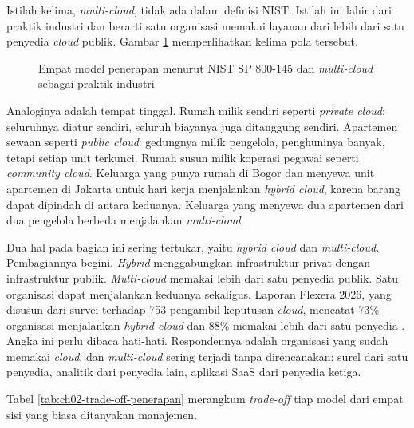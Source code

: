 Istilah kelima, \textit{multi-cloud}, tidak ada dalam definisi NIST. Istilah ini lahir dari
praktik industri dan berarti satu organisasi memakai layanan dari lebih dari satu penyedia
\textit{cloud} publik. Gambar \ref{fig:ch02-model-penerapan} memperlihatkan kelima pola
tersebut.

\begin{figure}[!htb]
  \centering
  
  \caption{Empat model penerapan menurut NIST SP 800-145 dan \textit{multi-cloud} sebagai
           praktik industri}
  \label{fig:ch02-model-penerapan}
\end{figure}

Analoginya adalah tempat tinggal. Rumah milik sendiri seperti \textit{private cloud}:
seluruhnya diatur sendiri, seluruh biayanya juga ditanggung sendiri. Apartemen sewaan
seperti \textit{public cloud}: gedungnya milik pengelola, penghuninya banyak, tetapi setiap
unit terkunci. Rumah susun milik koperasi pegawai seperti \textit{community cloud}.
Keluarga yang punya rumah di Bogor dan menyewa unit apartemen di Jakarta untuk hari kerja
menjalankan \textit{hybrid cloud}, karena barang dapat dipindah di antara keduanya.
Keluarga yang menyewa dua apartemen dari dua pengelola berbeda menjalankan
\textit{multi-cloud}.

Dua hal pada bagian ini sering tertukar, yaitu \textit{hybrid cloud} dan
\textit{multi-cloud}. Pembagiannya begini. \textit{Hybrid} menggabungkan infrastruktur
privat dengan infrastruktur publik. \textit{Multi-cloud} memakai lebih dari satu penyedia
publik. Satu organisasi dapat menjalankan keduanya sekaligus. Laporan Flexera 2026, yang
disusun dari survei terhadap 753 pengambil keputusan \textit{cloud}, mencatat 73\%
organisasi menjalankan \textit{hybrid cloud} dan 88\% memakai lebih dari satu penyedia
\cite{flexera2026}. Angka ini perlu dibaca hati-hati. Respondennya adalah organisasi
yang sudah memakai \textit{cloud}, dan \textit{multi-cloud} sering terjadi tanpa
direncanakan: surel dari satu penyedia, analitik dari penyedia lain, aplikasi SaaS dari
penyedia ketiga.

Tabel \ref{tab:ch02-trade-off-penerapan} merangkum \textit{trade-off} tiap model dari empat
sisi yang biasa ditanyakan manajemen.

